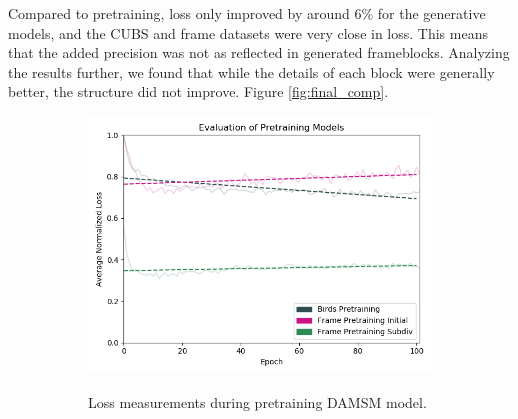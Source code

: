 \documentclass[letterpaper]{article} %
\begin{document}
Compared to pretraining, loss only improved by around 6\% for the generative 
models, and the CUBS and frame datasets were very close in loss. This means 
that the added precision was not as reflected in generated frameblocks. 
Analyzing the results further, we found that while the details of each block 
were generally better, the structure did not improve. Figure 
\ref{fig:final_comp}.

\begin{figure}[h!]
\centering
\begin{subfigure}{0.5\textwidth}
\begin{center}
\begin{minipage}[t]{0.95\linewidth}
\begin{centering}
{\includegraphics[width=\linewidth]{eval_pretrain.png}}
\caption{Loss measurements during pretraining DAMSM model.}
\label{fig:eval_pretrain}
\end{centering}
\end{minipage}
\end{center}
\end{subfigure}
\par\medskip
\begin{subfigure}{0.5\textwidth}
\begin{center}
\begin{minipage}[t]{0.95\linewidth}
\begin{centering}

\end{centering}
\end{minipage}
\end{center}
\end{subfigure}
\end{figure}
\end{document}
